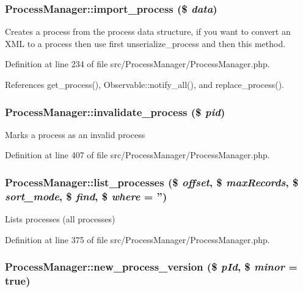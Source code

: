 \subsubsection{\setlength{\rightskip}{0pt plus 5cm}Process\-Manager::import\_\-process (\$ {\em data})}\label{classProcessManager_a5}


Creates a process from the process data structure, if you want to convert an XML to a process then use first unserialize\_\-process and then this method. 

Definition at line 234 of file src/Process\-Manager/Process\-Manager.php.

References get\_\-process(), Observable::notify\_\-all(), and replace\_\-process().
\subsubsection{\setlength{\rightskip}{0pt plus 5cm}Process\-Manager::invalidate\_\-process (\$ {\em pid})}\label{classProcessManager_a10}


Marks a process as an invalid process 

Definition at line 407 of file src/Process\-Manager/Process\-Manager.php.
\subsubsection{\setlength{\rightskip}{0pt plus 5cm}Process\-Manager::list\_\-processes (\$ {\em offset}, \$ {\em max\-Records}, \$ {\em sort\_\-mode}, \$ {\em find}, \$ {\em where} = '')}\label{classProcessManager_a9}


Lists processes (all processes) 

Definition at line 375 of file src/Process\-Manager/Process\-Manager.php.
\subsubsection{\setlength{\rightskip}{0pt plus 5cm}Process\-Manager::new\_\-process\_\-version (\$ {\em p\-Id}, \$ {\em minor} = true)}\label{classProcessManager_a6}



